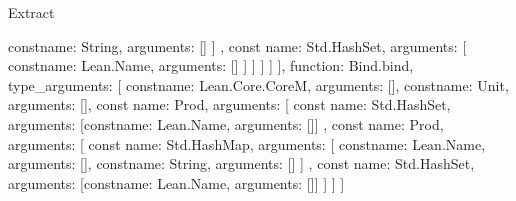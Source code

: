 \begin{lexlean}{Extract}
\begin{toolingmodule}
{{{{{{{{{{{{{{{{{{                                                      const{name: String, arguments: []}
                                                    ]
                                                  },
                                                  const{
                                                    name: Std.HashSet,
                                                    arguments: [
                                                      const{name: Lean.Name, arguments: []}
                                                    ]
                                                  }
                                                ]
                                              }
                                            ]
                                          }
                                        ]
                                      }
                                    }
                                  ],
                                  function: Bind.bind,
                                  type_arguments: [
                                    const{name: Lean.Core.CoreM, arguments: []},
                                    const{name: Unit, arguments: []},
                                    const{
                                      name: Prod,
                                      arguments: [
                                        const{
                                          name: Std.HashSet,
                                          arguments: [const{name: Lean.Name, arguments: []}]
                                        },
                                        const{
                                          name: Prod,
                                          arguments: [
                                            const{
                                              name: Std.HashMap,
                                              arguments: [
                                                const{name: Lean.Name, arguments: []},
                                                const{name: String, arguments: []}
                                              ]
                                            },
                                            const{
                                              name: Std.HashSet,
                                              arguments: [const{name: Lean.Name, arguments: []}]
                                            }
                                          ]
                                        }
                                      ]
                                    }
                                  ]
}}}}}}}}}}}}}
\end{toolingmodule}
\end{lexlean}

